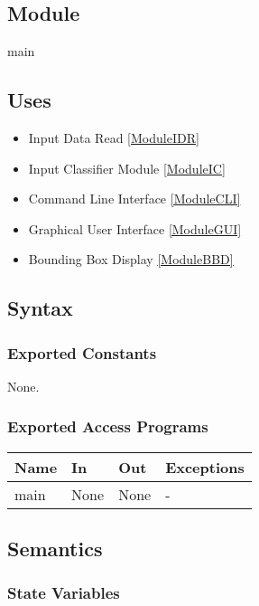 \documentclass[12pt, titlepage]{article}
\begin{document}
\subsection{Module}

main

\subsection{Uses}

\begin{itemize}
  \item Input Data Read \ref{ModuleIDR}
  \item Input Classifier Module \ref{ModuleIC}
  \item Command Line Interface \ref{ModuleCLI}
  \item Graphical User Interface \ref{ModuleGUI}
  \item Bounding Box Display \ref{ModuleBBD}
\end{itemize}

\subsection{Syntax}

\subsubsection{Exported Constants}

None.

\subsubsection{Exported Access Programs}

\begin{center}
\begin{tabular}{p{2cm} p{4cm} p{4cm} p{2cm}}
\hline
\textbf{Name} & \textbf{In} & \textbf{Out} & \textbf{Exceptions} \\
\hline
main & None & None & - \\
\hline
\end{tabular}
\end{center}

\subsection{Semantics}

\subsubsection{State Variables}
\end{document}
